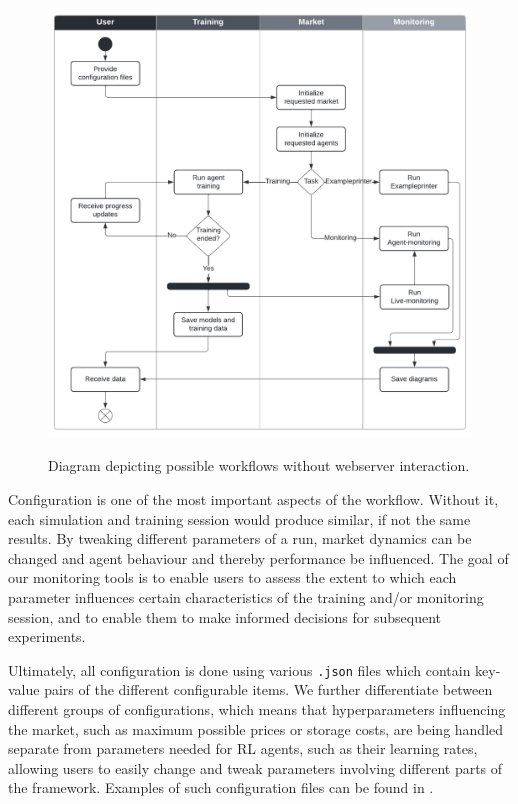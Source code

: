 \begin{figure}[t]
	\centering
	\includegraphics[width = \textwidth]{images/workflow_swimlanes.pdf}\\
	\caption{Diagram depicting possible workflows without webserver interaction.\\}\label{fig:WorkflowSwimlanes}
\end{figure}

Configuration is one of the most important aspects of the workflow. Without it, each simulation and training session would produce similar, if not the same results. By tweaking different parameters of a run, market dynamics can be changed and agent behaviour and thereby performance be influenced. The goal of our monitoring tools is to enable users to assess the extent to which each parameter influences certain characteristics of the training and/or monitoring session, and to enable them to make informed decisions for subsequent experiments.

Ultimately, all configuration is done using various \texttt{.json} files which contain key-value pairs of the different configurable items. We further differentiate between different groups of configurations, which means that hyperparameters influencing the market, such as maximum possible prices or storage costs, are being handled separate from parameters needed for RL agents, such as their learning rates, allowing users to easily change and tweak parameters involving different parts of the framework. Examples of such configuration files can be found in .

